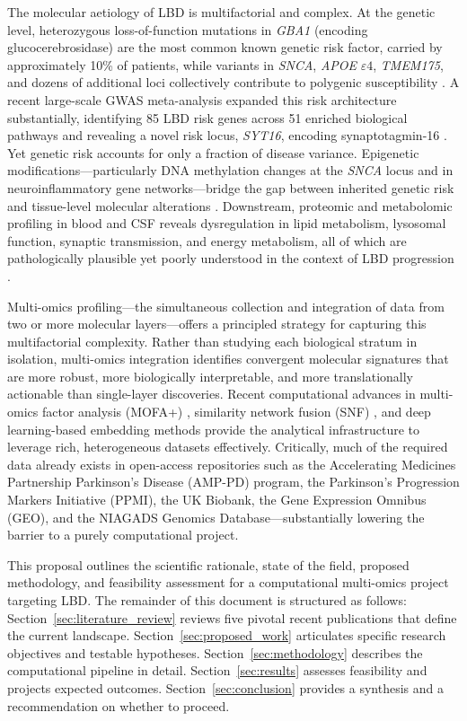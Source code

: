 The molecular aetiology of LBD is multifactorial and complex. At the genetic level, heterozygous loss-of-function mutations in \textit{GBA1} (encoding glucocerebrosidase) are the most common known genetic risk factor, carried by approximately 10\% of patients, while variants in \textit{SNCA}, \textit{APOE} $\varepsilon4$, \textit{TMEM175}, and dozens of additional loci collectively contribute to polygenic susceptibility \cite{chia2021lbd}. A recent large-scale GWAS meta-analysis expanded this risk architecture substantially, identifying 85 LBD risk genes across 51 enriched biological pathways and revealing a novel risk locus, \textit{SYT16}, encoding synaptotagmin-16 \cite{chia2025gwas}. Yet genetic risk accounts for only a fraction of disease variance. Epigenetic modifications---particularly DNA methylation changes at the \textit{SNCA} locus and in neuroinflammatory gene networks---bridge the gap between inherited genetic risk and tissue-level molecular alterations \cite{nabais2024methylation}. Downstream, proteomic and metabolomic profiling in blood and CSF reveals dysregulation in lipid metabolism, lysosomal function, synaptic transmission, and energy metabolism, all of which are pathologically plausible yet poorly understood in the context of LBD progression \cite{frontiers2024metabolomics}.

Multi-omics profiling---the simultaneous collection and integration of data from two or more molecular layers---offers a principled strategy for capturing this multifactorial complexity. Rather than studying each biological stratum in isolation, multi-omics integration identifies convergent molecular signatures that are more robust, more biologically interpretable, and more translationally actionable than single-layer discoveries. Recent computational advances in multi-omics factor analysis (MOFA+) \cite{argelaguet2020mofa}, similarity network fusion (SNF) \cite{wang2014snf}, and deep learning-based embedding methods provide the analytical infrastructure to leverage rich, heterogeneous datasets effectively. Critically, much of the required data already exists in open-access repositories such as the Accelerating Medicines Partnership Parkinson's Disease (AMP-PD) program, the Parkinson's Progression Markers Initiative (PPMI), the UK Biobank, the Gene Expression Omnibus (GEO), and the NIAGADS Genomics Database---substantially lowering the barrier to a purely computational project.

This proposal outlines the scientific rationale, state of the field, proposed methodology, and feasibility assessment for a computational multi-omics project targeting LBD. The remainder of this document is structured as follows: Section~\ref{sec:literature_review} reviews five pivotal recent publications that define the current landscape. Section~\ref{sec:proposed_work} articulates specific research objectives and testable hypotheses. Section~\ref{sec:methodology} describes the computational pipeline in detail. Section~\ref{sec:results} assesses feasibility and projects expected outcomes. Section~\ref{sec:conclusion} provides a synthesis and a recommendation on whether to proceed.
